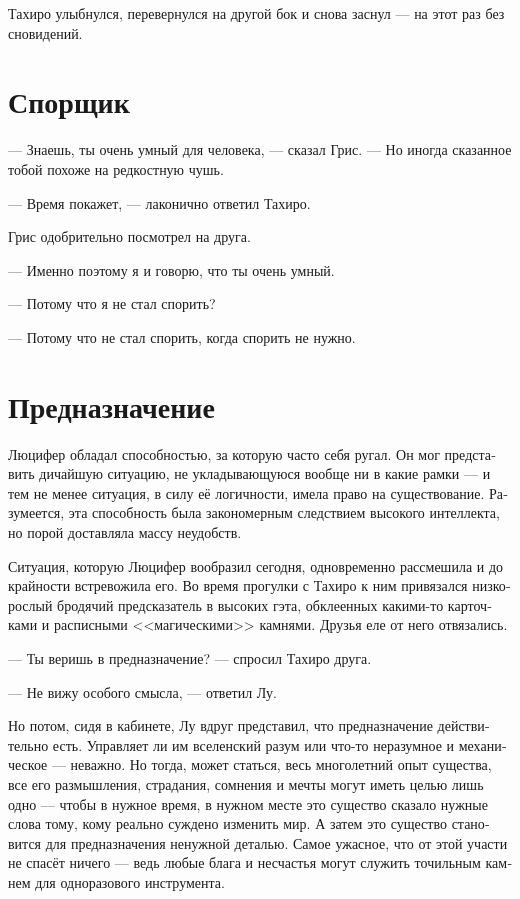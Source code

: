 \documentclass[a4paper,12pt,fleqn]{book}\usepackage{cooltooltips}\usepackage{polyglossia}\setdefaultlanguage[babelshorthands=true]{russian}\setotherlanguage{english}\defaultfontfeatures{Ligatures=TeX,Mapping=tex-text} \usepackage{xcolor}\definecolor{lightgray}{HTML}{bbbbbb}\color{lightgray}\newcommand{\ml}[3]{\textenglish{\textcolor{black}{#3}}}
\begin{document}
{Тахиро улыбнулся, перевернулся на другой бок и снова заснул --- на этот раз без сновидений.

\section{Спорщик}

--- Знаешь, ты очень умный для человека, --- сказал Грис.
--- Но иногда сказанное тобой похоже на редкостную чушь.

--- Время покажет, --- лаконично ответил Тахиро.

Грис одобрительно посмотрел на друга.

--- Именно поэтому я и говорю, что ты очень умный.

--- Потому что я не стал спорить?

--- Потому что не стал спорить, когда спорить не нужно.

\section{Предназначение}

Люцифер обладал способностью, за которую часто себя ругал.
Он мог представить дичайшую ситуацию, не укладывающуюся вообще ни в какие рамки --- и тем не менее ситуация, в силу её логичности, имела право на существование.
Разумеется, эта способность была закономерным следствием высокого интеллекта, но порой доставляла массу неудобств.

Ситуация, которую Люцифер вообразил сегодня, одновременно рассмешила и до крайности встревожила его.
Во время прогулки с Тахиро к ним привязался низкорослый бродячий предсказатель в высоких гэта, обклеенных какими-то карточками и расписными <<магическими>> камнями.
Друзья еле от него отвязались.

--- Ты веришь в предназначение? --- спросил Тахиро друга.

--- Не вижу особого смысла, --- ответил Лу.

Но потом, сидя в кабинете, Лу вдруг представил, что предназначение действительно есть.
Управляет ли им вселенский разум или что-то неразумное и механическое --- неважно.
Но тогда, может статься, весь многолетний опыт существа, все его размышления, страдания, сомнения и мечты могут иметь целью лишь одно --- чтобы в нужное время, в нужном месте это существо сказало нужные слова тому, кому реально суждено изменить мир.
А затем это существо становится для предназначения ненужной деталью.
Самое ужасное, что от этой участи не спасёт ничего --- ведь любые блага и несчастья могут служить точильным камнем для одноразового инструмента.

}
\end{document}
